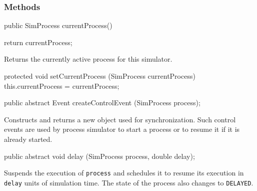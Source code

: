 
\subsubsection* {Methods}
\begin{code}

   public SimProcess currentProcess()\begin{hide} {
      return currentProcess;
   }\end{hide}
\end{code}
\begin{tabb}  Returns the currently active process for this simulator.
\end{tabb}
\begin{code}\begin{hide}

   protected void setCurrentProcess (SimProcess currentProcess) {
      this.currentProcess = currentProcess;
   }
\end{hide}

   public abstract Event createControlEvent (SimProcess process);
\end{code}
\begin{tabb} Constructs and returns a new  object used for synchronization.
Such control events are used by process simulator to start a process or to resume it if it is already
started.
\end{tabb}
\begin{code}

   public abstract void delay (SimProcess process, double delay);
\end{code}
\begin{tabb} Suspends the execution of \texttt{process} and
    schedules it to resume its execution in \texttt{delay} units of simulation
    time.  The state of the process also changes to \texttt{DELAYED}.
\end{tabb}
